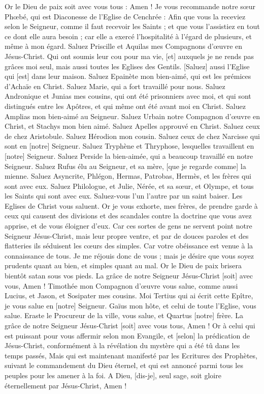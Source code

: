 \begin{multicols}{2}
Or le Dieu de paix soit avec vous tous : Amen !
\VerseOne{}Je vous recommande notre sœur Phœbé, qui est Diaconesse de l'Eglise de Cenchrée :
Afin que vous la receviez selon le Seigneur, comme il faut recevoir les Saints ; et que vous l'assistiez en tout ce dont elle aura besoin ; car elle a exercé l'hospitalité à l'égard de plusieurs, et même à mon égard.
Saluez Priscille et Aquilas mes Compagnons d'œuvre en Jésus-Christ.
Qui ont soumis leur cou pour ma vie, [et] auxquels je ne rends pas grâces moi seul, mais aussi toutes les Eglises des Gentils.
[Saluez] aussi l'Eglise qui [est] dans leur maison. Saluez Epainète mon bien-aimé, qui est les prémices d'Achaïe en Christ.
Saluez Marie, qui a fort travaillé pour nous.
Saluez Andronique et Junias mes cousins, qui ont été prisonniers avec moi, et qui sont distingués entre les Apôtres, et qui même ont été avant moi en Christ.
Saluez Amplias mon bien-aimé au Seigneur.
Saluez Urbain notre Compagnon d'œuvre en Christ, et Stachys mon bien aimé.
Saluez Apelles approuvé en Christ. Saluez ceux de chez Aristobule.
Saluez Hérodion mon cousin. Saluez ceux de chez Narcisse qui sont en [notre] Seigneur.
Saluez Tryphène et Thryphose, lesquelles travaillent en [notre] Seigneur. Saluez Perside la bien-aimée, qui a beaucoup travaillé en notre Seigneur.
Saluez Rufus élu au Seigneur, et sa mère, [que je regarde comme] la mienne.
Saluez Asyncrite, Phlégon, Hermas, Patrobas, Hermès, et les frères qui sont avec eux.
Saluez Philologue, et Julie, Nérée, et sa sœur, et Olympe, et tous les Saints qui sont avec eux.
Saluez-vous l'un l'autre par un saint baiser. Les Eglises de Christ vous saluent.
Or je vous exhorte, mes frères, de prendre garde à ceux qui causent des divisions et des scandales contre la doctrine que vous avez apprise, et de vous éloigner d'eux.
Car ces sortes de gens ne servent point notre Seigneur Jésus-Christ, mais leur propre ventre, et par de douces paroles et des flatteries ils séduisent les cœurs des simples.
Car votre obéissance est venue à la connaissance de tous. Je me réjouis donc de vous ; mais je désire que vous soyez prudents quant au bien, et simples quant au mal.
Or le Dieu de paix brisera bientôt satan sous vos pieds. La grâce de notre Seigneur Jésus-Christ [soit] avec vous, Amen !
Timothée mon Compagnon d'œuvre vous salue, comme aussi Lucius, et Jason, et Sosipater mes cousins.
Moi Tertius qui ai écrit cette Epître, je vous salue en [notre] Seigneur.
Gaïus mon hôte, et celui de toute l'Eglise, vous salue. Eraste le Procureur de la ville, vous salue, et Quartus [notre] frère.
La grâce de notre Seigneur Jésus-Christ [soit] avec vous tous, Amen !
Or à celui qui est puissant pour vous affermir selon mon Evangile, et [selon] la prédication de Jésus-Christ, conformément à la révélation du mystère qui a été tû dans les temps passés,
Mais qui est maintenant manifesté par les Ecritures des Prophètes, suivant le commandement du Dieu éternel, et qui est annoncé parmi tous les peuples pour les amener à la foi.
A Dieu, [dis-je], seul sage, soit gloire éternellement par Jésus-Christ, Amen !
\PPE{}
\end{multicols}
